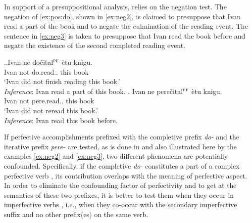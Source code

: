 In support of a presuppositional analysis, \citet{Kagan:book} relies on the negation test. The negation of \ref{ex:pos:do}, shown in \ref{ex:neg2}, is claimed to presuppose that Ivan read a part of the book and to negate the culmination of the reading event. The sentence in \ref{ex:neg3} is taken to presuppose that Ivan read the book before and negate the existence of the second completed reading event.

\ex.\ag.\label{ex:neg2}Ivan ne do\v{c}ital$^{\textsc{pf}}$ \`{e}tu knigu.\\
Ivan not do.read.. this book\\
\trans `Ivan did not finish reading this book.'\\
\textit{Inference}: Ivan read a part of this book.
\bg. \label{ex:neg3}Ivan ne pere\v{c}ital$^{\textsc{pf}}$ \`{e}tu knigu.\\
Ivan not pere.read.. this book\\
\trans `Ivan did not reread this book.'\\
\textit{Inference}: Ivan read this book before.

If perfective accomplishments prefixed with the completive  prefix \textit{do-}   and the iterative prefix \textit{pere-}   are tested, as is done in \citealt{Kagan:book} and also illustrated here by the examples \ref{ex:neg2} and \ref{ex:neg3}, two different phenomena are potentially confounded. Specifically, if the completive  \textit{do-}   constitutes a part of a complex perfective verb , its contribution overlaps with the meaning of perfective aspect. In order to eliminate the confounding factor of perfectivity and to get at the semantics of these two prefixes, it is better to test them when they occur in imperfective verbs , i.e., when they co-occur with the secondary imperfective  suffix and no other prefix(es) on the same verb.

